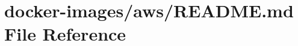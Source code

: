 \hypertarget{docker-images_2aws_2_r_e_a_d_m_e_8md}{}\section{docker-\/images/aws/\+R\+E\+A\+D\+ME.md File Reference}
\label{docker-images_2aws_2_r_e_a_d_m_e_8md}
